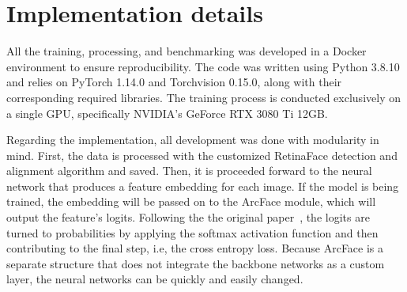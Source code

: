 \documentclass[class=report, crop=false, a4paper, 12pt]{standalone}
\begin{document}
\section{Implementation details}
\par All the training, processing, and benchmarking was developed in a Docker environment to ensure reproducibility. The code was written using Python 3.8.10 and relies on PyTorch 1.14.0 and Torchvision 0.15.0, along with their corresponding required libraries. The training process is conducted exclusively on a single GPU, specifically NVIDIA's GeForce RTX 3080 Ti 12GB. 
\par Regarding the implementation, all development was done with modularity in mind. First, the data is processed with the customized RetinaFace detection and alignment algorithm and saved. Then, it is proceeded forward to the neural network that produces a feature embedding for each image. If the model is being trained, the embedding will be passed on to the ArcFace module, which will output the feature's logits. Following the the original paper~\autocite{dengArcFaceAdditiveAngular}, the logits are turned to probabilities by applying the softmax activation function and then contributing to the final step, i.e, the cross entropy loss. Because ArcFace is a separate structure that does not integrate the backbone networks as a custom layer, the neural networks can be quickly and easily changed.
\end{document}
